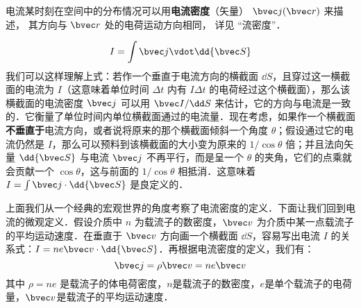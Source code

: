 

电流某时刻在空间中的分布情况可以用\textbf{电流密度}（矢量） $\bvec j(\bvec r)$ 来描述， 其方向与 $\bvec r$ 处的电荷运动方向相同， 详见 “流密度”．

\begin{equation}
I = \int \bvec j \vdot \dd{\bvec S}
\end{equation}
我们可以这样理解上式：若作一个垂直于电流方向的横截面 $\dd S$，且穿过这一横截面的电流为 $I$（这意味着单位时间 $\Delta t$ 内有 $I\Delta t$ 的电荷经过这个横截面），那么该横截面的电流密度 $\bvec j$ 可以用 $\bvec I/\dd S$ 来估计，它的方向与电流是一致的．它衡量了单位时间内单位横截面通过的电流量．现在考虑，如果作一个横截面\textbf{不垂直于}电流方向，或者说将原来的那个横截面倾斜一个角度 $\theta$；假设通过它的电流仍然是 $I$，那么可以预料到该横截面的大小变为原来的 $1/\cos\theta$ 倍；并且法向矢量 $\dd{\bvec S}$ 与电流 $\bvec j$ 不再平行，而是呈一个 $\theta$ 的夹角，它们的点乘就会贡献一个 $\cos\theta$，这与前面的 $1/\cos\theta$ 相抵消．这意味着 $I=\int \bvec j\cdot \dd{\bvec S}$ 是良定义的．

上面我们从一个经典的宏观世界的角度考察了电流密度的定义．下面让我们回到电流的微观定义．假设介质中 $n$ 为载流子的数密度，$\bvec v$ 为介质中某一点载流子的平均运动速度．在垂直于 $\bvec v$ 方向画一个横截面 $\dd S$，容易写出电流 $I$ 的关系式：$I=ne\bvec v \cdot \dd{\bvec S}$．再根据电流密度的定义，我们有：
\begin{equation}
\bvec j = \rho \bvec v = ne \bvec v
\end{equation}
其中 $\rho=ne$ 是载流子的体电荷密度，$n$是载流子的数密度，$e$是单个载流子的电荷量，$\bvec v$是载流子的平均运动速度\cite{GriffE}．
